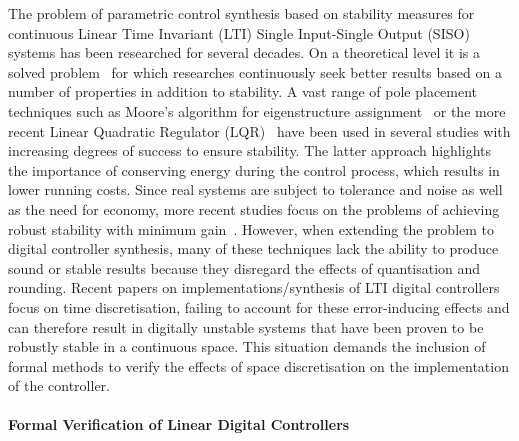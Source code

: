 \documentclass{sig-alternate-05-2015}
\begin{document}
The problem of parametric control synthesis based on stability measures for
continuous Linear Time Invariant (LTI) Single Input-Single Output (SISO)
systems has been researched for several decades.  On a theoretical level it
is a solved problem~\cite{wonham1967pole} for which researches continuously
seek better results based on a number of properties in addition to
stability.  A vast range of pole placement techniques such as Moore's
algorithm for eigenstructure assignment~\cite{klein1977eigenvalue} or the
more recent Linear Quadratic Regulator (LQR)~\cite{bemporad2002explicit}
have been used in several studies with increasing degrees of success to
ensure stability.  The latter approach highlights the importance of
conserving energy during the control process, which results in lower running
costs.  Since real systems are subject to tolerance and noise as well as the
need for economy, more recent studies focus on the problems of achieving
robust stability with minimum
gain~\cite{schmid2014unified,konigorski2012pole}.  However, when extending
the problem to digital controller synthesis, many of these techniques lack
the ability to produce sound or stable results because they disregard the
effects of quantisation and rounding.  Recent papers on
implementations/synthesis of LTI digital
controllers~\cite{das2013lqr,ghosh2013fpga} focus on time discretisation,
failing to account for these error-inducing effects and can therefore result
in digitally unstable systems that have been proven to be robustly stable in
a continuous space.  This situation demands the inclusion of formal methods
to verify the effects of space discretisation on the implementation of the
controller.

\paragraph{Formal Verification of Linear Digital Controllers} 
\end{document}
